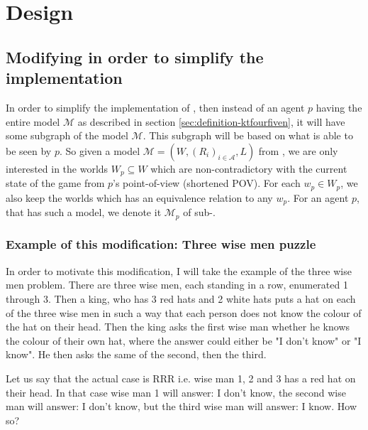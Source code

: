\section{Design}

\newcommand{\POVModel}{\mathcal{M}}

\subsection{Modifying \SfiveN{} in order to simplify the implementation}
In order to simplify the implementation of \SfiveN{}, then instead of an agent $p$ having the entire model $\mathcal{M}$ as described in section \ref{sec:definition-ktfourfiven}, it will have some subgraph of the model $\mathcal{M}$. 
This subgraph will be based on what is able to be seen by $p$. 
So given a model $\mathcal{M} = (W,(R_i)_{i\in \mathcal{A}},L)$ from \SfiveN{}, we are only interested in the worlds $W_{p} \subseteq W$ which are non-contradictory with the current state of the game from $p$'s point-of-view (shortened POV). 
For each $w_p \in W_{p}$, we also keep the worlds which has an equivalence relation to any $w_p$.
For an agent $p$, that has such a model, we denote it $\mathcal{M}_p$ of sub-\SfiveN{}.

\subsubsection{Example of this modification: Three wise men puzzle}\label{sec:motivation}
In order to motivate this modification, I will take the example of the three wise men problem.
There are three wise men, each standing in a row, enumerated 1 through 3. 
Then a king, who has 3 red hats and 2 white hats puts a hat on each of the three wise men in such a way that each person does not know the colour of the hat on their head. 
Then the king asks the first wise man whether he knows the colour of their own hat, where the answer could either be "I don't know" or "I know". 
He then asks the same of the second, then the third.

Let us say that the actual case is RRR i.e. wise man 1, 2 and 3 has a red hat on their head.
In that case wise man 1 will answer: I don't know, the second wise man will answer: I don't know, but the third wise man will answer: I know. How so?




